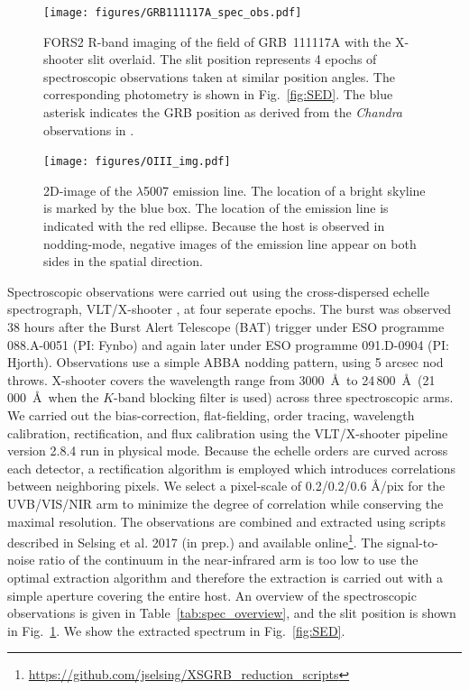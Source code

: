 \documentclass{aa}    %
\begin{document}
\begin{figure}
	\centering
	\texttt{[image: figures/GRB111117A\_spec\_obs.pdf]}
	\caption{
	FORS2 R-band imaging of the field of GRB~111117A with the X-shooter slit overlaid. The slit
	position represents 4 epochs of spectroscopic observations taken at similar
	position angles. The corresponding photometry
	is shown in Fig.~\ref{fig:SED}. The blue asterisk indicates the GRB position as
	derived from the \emph{Chandra} observations in \citet{Sakamoto2013}. 
	}
	\label{fig:spec_setup}
\end{figure}

\begin{figure}
	\centering
	\texttt{[image: figures/OIII\_img.pdf]}
	\caption{2D-image of the \oiii$\lambda$5007 emission line. The location of a bright skyline is marked by the blue box. The location of the emission line is indicated with the red ellipse. Because the host is observed in nodding-mode, negative images of the emission line appear on both sides in the spatial direction.}
	\label{fig:line}
\end{figure}

Spectroscopic observations were carried out using the cross-dispersed echelle
spectrograph, VLT/X-shooter \citep{Vernet2011}, at four seperate epochs. The
burst was observed 38 hours after the Burst Alert Telescope (BAT) trigger under
ESO programme 088.A-0051 (PI: Fynbo) and again later under ESO programme
091.D-0904 (PI: Hjorth). Observations use a simple ABBA nodding pattern, using 5
arcsec nod throws. X-shooter covers the wavelength range from 3000~\AA~to
24\,800~\AA~(21\,000~\AA~when the $K$-band blocking filter is used) across three
spectroscopic arms. We carried out the bias-correction, flat-fielding, order
tracing, wavelength calibration, rectification, and flux calibration using the
VLT/X-shooter pipeline version 2.8.4 \citep{Modigliani2010} run in physical
mode. Because the echelle orders are curved across each detector, a rectification
algorithm is employed which introduces correlations between neighboring pixels.
We select a pixel-scale of 0.2/0.2/0.6 \AA/pix for the UVB/VIS/NIR arm to
minimize the degree of correlation while conserving the maximal resolution. The
observations are combined and extracted using scripts described in Selsing et
al. 2017 (in prep.) and available
online\footnote{\url{https://github.com/jselsing/XSGRB_reduction_scripts}}. The
signal-to-noise ratio of the continuum in the near-infrared arm is too low to
use the optimal extraction algorithm \citep{Horne1986} and therefore the
extraction is carried out with a simple aperture covering the entire host. An
overview of the spectroscopic observations is given in
Table~\ref{tab:spec_overview}, and the slit position is shown in
Fig.~\ref{fig:spec_setup}. We show the extracted spectrum in Fig.~\ref{fig:SED}.
\end{document}
